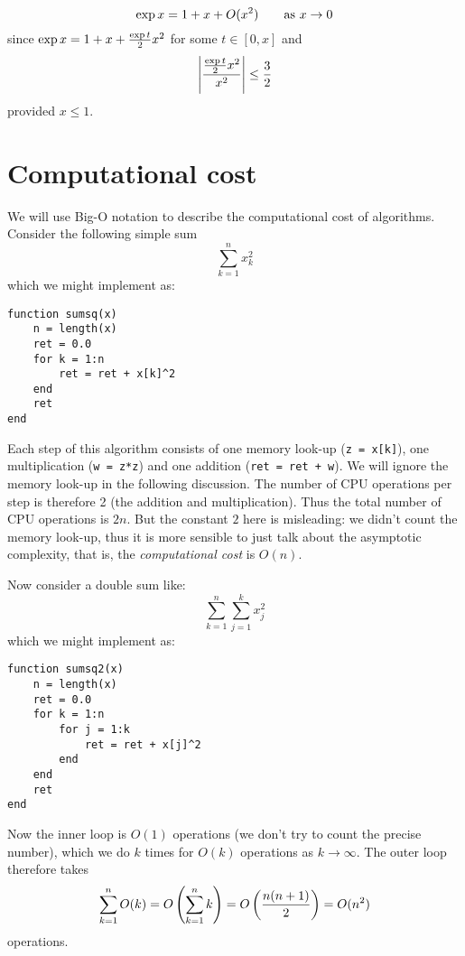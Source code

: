 \begin{example}
\[
\exp x = 1 + x + O(x^2) \qquad \hbox{as $x \ensuremath{\rightarrow} 0$}
\]
since $\exp x = 1 + x + {\exp t \over 2} x^2$ for some $t \in [0,x]$ and
\[
\left|{{\exp t \over 2} x^2 \over x^2}\right| \leq {3 \over 2}
\]
provided $x \leq 1$. \end{example}

\section{Computational cost}
We will use Big-O notation to describe the computational cost of algorithms. Consider the following simple sum
\[
\sum_{k=1}^n x_k^2
\]
which we might implement as:

\begin{verbatim}
function sumsq(x)
    n = length(x)
    ret = 0.0
    for k = 1:n
        ret = ret + x[k]^2
    end
    ret
end
\end{verbatim}
Each step of this algorithm consists of one memory look-up (\texttt{z = x[k]}), one multiplication (\texttt{w = z*z}) and one addition (\texttt{ret = ret + w}). We will ignore the memory look-up in the following discussion. The number of CPU operations per step is therefore 2 (the addition and multiplication). Thus the total number of CPU operations is $2n$. But the constant $2$ here is misleading: we didn't count the memory look-up, thus it is more sensible to just talk about the asymptotic complexity, that is, the \emph{computational cost} is $O(n)$.

Now consider a double sum like:
\[
\sum_{k=1}^n \sum_{j=1}^k x_j^2
\]
which we might implement as:

\begin{verbatim}
function sumsq2(x)
    n = length(x)
    ret = 0.0
    for k = 1:n
        for j = 1:k
            ret = ret + x[j]^2
        end
    end
    ret
end
\end{verbatim}
Now the inner loop is $O(1)$ operations (we don't try to count the precise number), which we do $k$ times for $O(k)$ operations as $k \ensuremath{\rightarrow} \ensuremath{\infty}$. The outer loop therefore takes
\[
\ensuremath{\sum}_{k = 1}^n O(k) = O\left(\ensuremath{\sum}_{k = 1}^n k\right) = O\left( {n (n+1) \over 2} \right) = O(n^2)
\]
operations.



